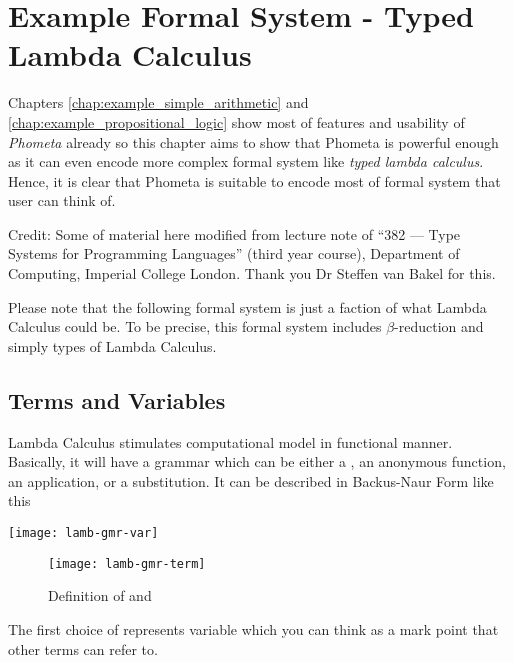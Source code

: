 \documentclass[master.tex]{subfiles}
\begin{document}
\chapter{Example Formal System - Typed Lambda Calculus}
\label{chap:example_lambda_calculus}

Chapters \ref{chap:example_simple_arithmetic} and
\ref{chap:example_propositional_logic} show most of features and usability of
\emph{Phometa} already so this chapter aims to show that Phometa is powerful
enough as it can even encode more complex formal system like \emph{typed lambda
  calculus}. Hence, it is clear that Phometa is suitable to encode most of
formal system that user can think of.

Credit: Some of material here modified from lecture note of ``382 --- Type
Systems for Programming Languages'' (third year course), Department of
Computing, Imperial College London. Thank you Dr Steffen van Bakel for this.

Please note that the following formal system is just a faction of what Lambda
Calculus could be. To be precise, this formal system includes $\beta$-reduction
and simply types of Lambda Calculus.

\section{Terms and Variables}

Lambda Calculus stimulates computational model in functional manner. Basically,
it will have a grammar  which can be either a
, an anonymous function, an application, or a substitution.
It can be described in Backus-Naur Form like this


\begin{center}
    \texttt{[image: lamb-gmr-var]}
\end{center}

\begin{figure}[H]
    \centering

\begin{minipage}{0.7\textwidth}
    \texttt{[image: lamb-gmr-term]}
\end{minipage}

\caption{Definition of  and }
\end{figure}

The first choice of  represents variable which you can think as a
mark point that other terms can refer to.
\end{document}
